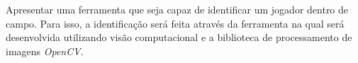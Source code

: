 
\begin{block}{}
 Apresentar uma ferramenta que seja capaz de identificar um jogador dentro de campo. Para isso, a identificação será feita através da ferramenta na qual será desenvolvida utilizando visão computacional e a biblioteca de processamento de imagens \textit{OpenCV}.
\end{block}

